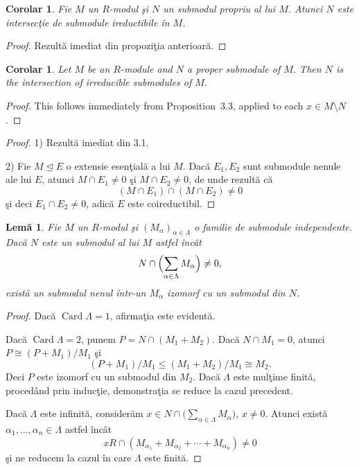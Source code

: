 \documentclass[12pt,a4paper]{book}
\newcommand{\ess}{\trianglelefteq}  %
\theoremstyle{plain}
\newtheorem{lemma}[theorem]{Lemă}
\newtheorem{corollary}[theorem]{Corolar}
\theoremstyle{definition}
\theoremstyle{remark}
\begin{document}
\begin{corollary}
Fie \(M\) un \(R\)-modul şi \(N\) un submodul propriu al lui \(M\).
Atunci \(N\) este intersecţie de submodule ireductibile în \(M\).
\end{corollary}

\begin{proof}
Rezultă imediat din propoziţia anterioară.
\end{proof}


\begin{corollary}
Let \(M\) be an \(R\)-module and \(N\) a proper submodule of \(M\).
Then \(N\) is the intersection of irreducible submodules of \(M\).
\end{corollary}

\begin{proof}
This follows immediately from Proposition~3.3, applied to each
\(x \in M \setminus N\).
\end{proof}

\begin{proof}
1) Rezultă imediat din 3.1.

2) Fie $M \ess E$ o extensie esenţială a lui $M$. Dacă $E_1,E_2$ sunt
submodule nenule ale lui $E$, atunci $M \cap E_1 \neq 0$ şi
$M \cap E_2 \neq 0$, de unde rezultă că
\[
(M \cap E_1) \cap (M \cap E_2) \neq 0
\]
şi deci $E_1 \cap E_2 \neq 0$, adică $E$ este coireductibil.
\end{proof}


\begin{lemma}
Fie $M$ un $R$-modul şi $(M_\alpha)_{\alpha \in \Lambda}$ o familie
de submodule independente. Dacă $N$ este un submodul al lui $M$ astfel
încât
\[
N \cap \Bigl(\sum_{\alpha \in \Lambda} M_\alpha\Bigr) \neq 0,
\]
există un submodul nenul într-un $M_\alpha$ izomorf cu un submodul din $N$.
\end{lemma}

\begin{proof}
Dacă $\operatorname{Card}\Lambda = 1$, afirmaţia este evidentă.

Dacă $\operatorname{Card}\Lambda = 2$, punem $P = N \cap (M_1 + M_2)$.
Dacă $N \cap M_1 = 0$, atunci $P \cong (P + M_1)/M_1$ şi
\[
(P + M_1)/M_1 \leq (M_1 + M_2)/M_1 \cong M_2.
\]
Deci $P$ este izomorf cu un submodul din $M_2$.
Dacă $\Lambda$ este mulţime finită, procedând prin inducţie,
demonstraţia se reduce la cazul precedent.

Dacă $\Lambda$ este infinită, considerăm
$x \in N \cap \bigl(\sum_{\alpha \in \Lambda} M_\alpha\bigr)$,
$x \neq 0$. Atunci există $\alpha_1,\ldots,\alpha_n \in \Lambda$ astfel
încât
\[
xR \cap (M_{\alpha_1} + M_{\alpha_2} + \cdots + M_{\alpha_n}) \neq 0
\]
şi ne reducem la cazul în care $\Lambda$ este finită.
\end{proof}
\end{document}
